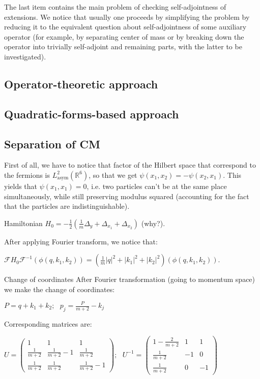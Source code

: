 \documentclass[11pt, a4paper, german]{article}
\theoremstyle{plain}
\theoremstyle{definition}
\theoremstyle{remark}
\numberwithin{equation}{section}
\numberwithin{theorem}{section}
\begin{document}
The last item contains the main problem of checking self-adjointness of extensions. We notice that usually one proceeds by simplifying the problem by reducing it to the equivalent question about self-adjointness of some auxiliary operator (for example, by separating center of mass or by breaking down the operator into trivially self-adjoint and remaining parts, with the latter to be investigated).

\subsection{Operator-theoretic approach}

\subsection{Quadratic-forms-based approach}

\subsection{Separation of CM}

First of all, we have to notice that factor of the Hilbert space that correspond to the fermions is $ L ^{2} _{\text{asym} } \left( \mathbb{R}^{6} \right) $, so that we get $ \psi \left( x _{1} , x _{2} \right) = - \psi \left( x _{2} , x _{1} \right) $. This yields that $ \psi \left( x_1, x_1 \right) =0 $, i.e. two particles can't be at the same place simultaneously, while still preserving modulus squared (accounting for the fact that the particles are indistinguishable).

Hamiltonian
$ H _{0} = - \frac{1}{2} \left( \frac{1}{m} \Delta _{y} + \Delta _{x _{1} } + \Delta _{x _{2} } \right) $ (why?).

After applying Fourier transform, we notice that:

$ \mathcal{F} H _{0} \mathcal{F} ^{-1} \left( \phi \left( q, k _{1} , k _{2} \right) \right) = \left( \frac{1}{m} \left| q \right| ^{2} + \left| k _{1} \right| ^{2} + \left| k _{2} \right| ^{2} \right) \left( \phi \left( q, k _{1} , k _{2} \right) \right) $.

Change of coordinates
After Fourier transformation (going to momentum space) we make the change of coordinates:

$ P = q+k _{1} + k _{2} ; \,\,\,\, p _{j} = \frac{P }{m+2} - k _{j} $

Corresponding matrices are:

$ U = \left( \begin{array}{ccc} 1 & 1 & 1 \\ \tfrac{1}{m+2} & \tfrac{1}{m+2} -1 & \tfrac{1}{m+2} \\ \tfrac{1}{m+2} & \tfrac{1}{m+2} & \tfrac{1}{m+2} -1 \end{array} \right) ; \,\,\,\, U ^{-1} = \left( \begin{array}{ccc} 1 - \tfrac{2}{m+2} & 1 & 1 \\ \tfrac{1}{m+2} & -1 & 0 \\ \tfrac{1}{m+2} & 0 & -1 \end{array} \right) $
\end{document}
